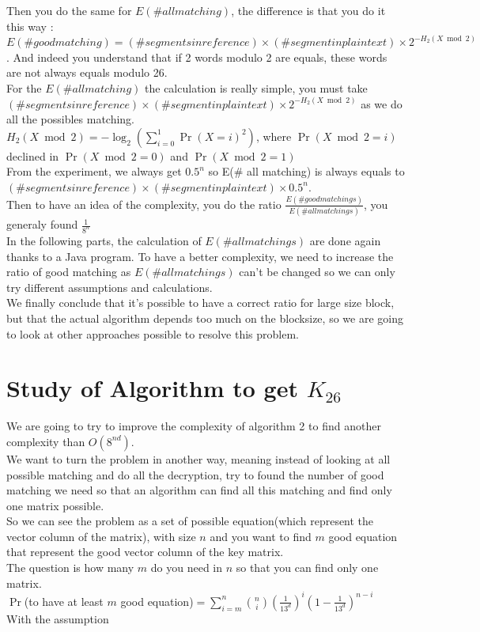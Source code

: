 \documentclass{article}
\begin{document}
Then you do the same for  $E(\# all matching)$, the difference is that you do it this way : $E(\# good matching) = (\# segments in reference) \times (\#segment in plaintext) \times 2^{-H_{2}(X \bmod 2)}$ . And indeed you understand that if 2 words modulo 2 are equals, these words are not always equals modulo 26.\\
${}$\hspace{1em}For the $E(\# all matching)$ the calculation is really simple, you must take $(\# segments in reference) \times (\#segment in plaintext) \times 2^{-H_{2}(X \bmod 2)}$ as we do all the possibles matching.\\
$H_{2}(X \bmod 2) = -\log_2(\sum_{i=0}^{1}{\Pr(X=i)^2})$, where $\Pr(X \bmod 2=i)$ declined in $\Pr(X \bmod 2=0)$ and $\Pr(X \bmod 2 =1)$\\
From the experiment, we always get $0.5^n$ so E(\# all matching) is always equals to $(\# segments in reference) \times (\#segment in plaintext) \times 0.5^n$.\\
Then to have an idea of the complexity, you do the ratio $\frac{E(\# good matchings)}{E(\# all matchings)}$, you generaly found $\frac{1}{8^n}$\\
In the following parts, the calculation of $E(\# all matchings)$ are done again thanks to a Java program.
To have a better complexity, we need to increase the ratio of good matching as $E(\# all matchings)$ can't be changed so we can only try different assumptions and calculations.\\
We finally conclude that it's possible to have a correct ratio for large size block, but that the actual algorithm depends too much on the blocksize, so we are going to look at other approaches possible to resolve this problem.\\


\section{Study of Algorithm to get $K_{26}$}
We are going to try to improve the complexity of algorithm 2 to find another complexity than $O(8^{nd})$.\\
We want to turn the problem in another way, meaning instead of looking at all possible matching and do all the decryption, try to found the number of good matching we need so that an algorithm can find all this matching and find only one matrix possible.\\
So we can see the problem as a set of possible equation(which represent the vector column of the matrix), with size $n$ and you want to find $m$ good equation that represent the good vector column of the key matrix.\\
The question is how many $m$ do you need in $n$ so that you can find only one matrix.\\
$\Pr$(to have at least $m$ good equation)$=\sum_{i=m}^{n}{{n \choose i}(\frac{1}{13^d})^i (1-\frac{1}{13^d})^{n-i}}$\\
With the assumption
\end{document}
